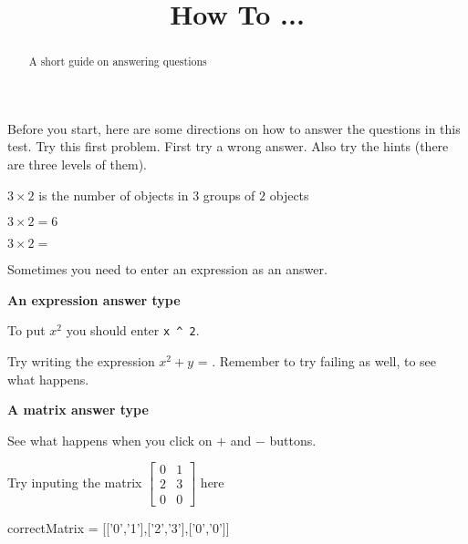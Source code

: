 \documentclass{ximera}
\title{How To ...}
\begin{document}
\begin{abstract}
  A short guide on answering questions
\end{abstract}
\maketitle
Before you start, here are some directions on how to answer the questions in this test. 
Try this first problem. First try a wrong answer. Also try the hints (there are three levels of them). 
\begin{question}
\begin{solution}
\begin{hint}
$3 \times 2$ is the number of objects in $3$ groups of $2$ objects
\end{hint}
\begin{hint}
\end{hint}
\begin{hint}
$3\times 2=6$
\end{hint}
$3\times 2 = $ 
\end{solution}
\end{question}

Sometimes you need to enter an expression as an answer. 
\begin{question}
\textbf{An expression answer type}
\begin{solution}
\begin{hint}
To put $x^2$ you should enter \verb+x ^ 2+.
\end{hint}
Try writing the expression $x^2+y$ = . Remember to try failing as well, to see what happens.
\end{solution}
\end{question}

\begin{question}
\textbf{A matrix answer type}
\begin{solution}
\begin{hint}
See what happens when you click on $+$ and $-$ buttons.
\end{hint}
Try inputing the matrix $\begin{bmatrix} 0&1\\2&3\\0&0\end{bmatrix}$ here
\begin{matrix-answer}[name=M]
correctMatrix = [['0','1'],['2','3'],['0','0']]
\end{matrix-answer}
\end{solution}
\end{question}
\end{document}
